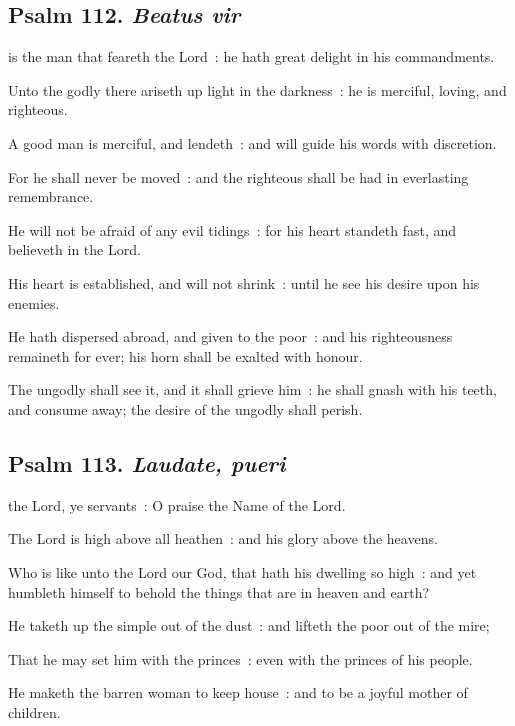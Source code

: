 \subsection{Psalm 112. \textit{Beatus vir}}


 is the man that feareth the Lord~: he hath great delight in his commandments.\par
{}
Unto the godly there ariseth up light in the darkness~: he is merciful, loving, and righteous.\par
{}A good man is merciful, and lendeth~: and will guide his words with discretion.\par
{}For he shall never be moved~: and the righteous shall be had in everlasting remembrance.\par
{}He will not be afraid of any evil tidings~: for his heart standeth fast, and believeth in the Lord.\par
{}His heart is established, and will not shrink~: until he see his desire upon his enemies.\par
{}He hath dispersed abroad, and given to the poor~: and his righteousness remaineth for ever; his horn shall be exalted with honour.\par
{}The ungodly shall see it, and it shall grieve him~: he shall gnash with his teeth, and consume away; the desire of the ungodly shall perish.\par

\subsection{Psalm 113. \textit{Laudate, pueri}}


 the Lord, ye servants~: O praise the Name of the Lord.\par
{}
The Lord is high above all heathen~: and his glory above the heavens.\par
{}Who is like unto the Lord our God, that hath his dwelling so high~: and yet humbleth himself to behold the things that are in heaven and earth?\par
{}He taketh up the simple out of the dust~: and lifteth the poor out of the mire;\par
{}That he may set him with the princes~: even with the princes of his people.\par
{}He maketh the barren woman to keep house~: and to be a joyful mother of children.


